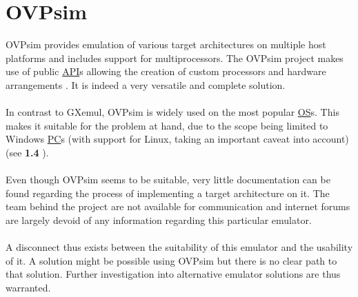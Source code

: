 \section{OVPsim}
\label{OVPsim}
OVPsim provides emulation of various target architectures on multiple host platforms and includes support for multiprocessors. The OVPsim project makes use of public \hyperref[listAbr]{API}s allowing the creation of custom processors and hardware arrangements \cite{Imperas2020}. It is indeed a very versatile and complete solution.
\\\\
In contrast to GXemul, OVPsim is widely used on the most popular \hyperref[listAbr]{OS}s. This makes it suitable for the problem at hand, due to the scope being limited to Windows \hyperref[listAbr]{PC}s (with support for Linux, taking an important caveat into account)(see \textbf{1.4 }).
\\\\
Even though OVPsim seems to be suitable, very little documentation can be found regarding the process of implementing a target architecture on it. The team behind the project are not available for communication and internet forums are largely devoid of any information regarding this particular emulator. 
\\\\
A disconnect thus exists between the suitability of this emulator and the usability of it. A solution might be possible using OVPsim but there is no clear path to that solution. Further investigation into alternative emulator solutions are thus warranted.


